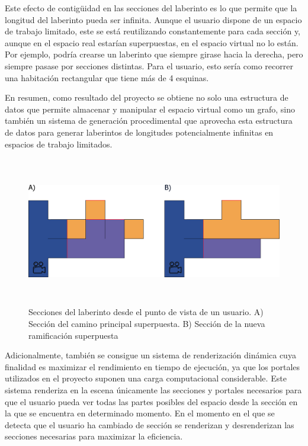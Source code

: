 \documentclass[../main.tex]{subfiles}
\begin{document}
Este efecto de contigüidad en las secciones del laberinto es lo que permite que la longitud del laberinto pueda ser infinita. Aunque el usuario dispone de un espacio de trabajo limitado, este se está reutilizando constantemente para cada sección y, aunque en el espacio real estarían superpuestas, en el espacio virtual no lo están. Por ejemplo, podría crearse un laberinto que siempre girase hacia la derecha, pero siempre pasase por secciones distintas. Para el usuario, esto sería como recorrer una habitación rectangular que tiene más de 4 esquinas.

En resumen, como resultado del proyecto se obtiene no solo una estructura de datos que permite almacenar y manipular el espacio virtual como un grafo, sino también un sistema de generación procedimental que aprovecha esta estructura de datos para generar laberintos de longitudes potencialmente infinitas en espacios de trabajo limitados.

\begin{figure}[h!]
\hspace{-1cm}
\includegraphics[width=16cm,height=6.5cm]{imagenes/Impossible_Space.png}
\caption{Secciones del laberinto desde el punto de vista de un usuario. A) Sección del camino principal superpuesta. B) Sección de la nueva ramificación superpuesta}
\label{fig:Impossible_Space}
\end{figure}

Adicionalmente, también se consigue un sistema de renderización dinámica cuya finalidad es maximizar el rendimiento en tiempo de ejecución, ya que los portales utilizados en el proyecto suponen una carga computacional considerable. Este sistema renderiza en la escena únicamente las secciones y portales necesarios para que el usuario pueda ver todas las partes posibles del espacio desde la sección en la que se encuentra en determinado momento. En el momento en el que se detecta que el usuario ha cambiado de sección se renderizan y desrenderizan las secciones necesarias para maximizar la eficiencia.
\end{document}
